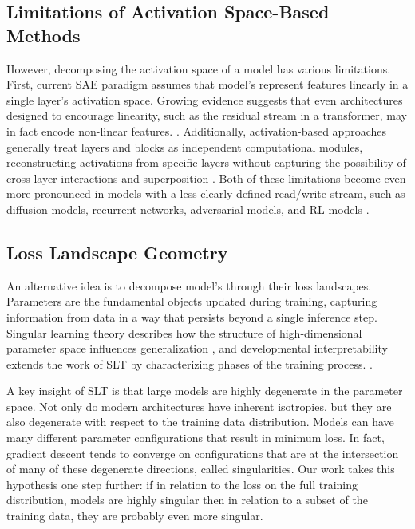 \documentclass{article}
\theoremstyle{plain}
\theoremstyle{definition}
\theoremstyle{remark}
\begin{document}
\subsection{Limitations of Activation Space-Based Methods}

However, decomposing the activation space of a model has various limitations.  First, current SAE paradigm assumes that model's represent features linearly in a single layer's activation space. Growing evidence suggests that even architectures designed to encourage linearity, such as the residual stream in a transformer, may in fact encode non-linear features. \cite{engels2024not,engels2024decomposing}. Additionally, activation-based approaches generally treat layers and blocks as independent computational modules, reconstructing activations from specific layers without capturing the possibility of cross-layer interactions and superposition \cite{merullo2024talking,lindsey2024sparse}. Both of these limitations become even more pronounced in models with a less clearly defined read/write stream, such as diffusion models, recurrent networks, adversarial models, and RL models \cite{pascanu2013difficulty,goodfellow2014generative,ho2020denoising,mnih2015human}. 

\subsection{Loss Landscape Geometry}

An alternative idea is to decompose model's through their loss landscapes. Parameters are the fundamental objects updated during training, capturing information from data in a way that persists beyond a single inference step. Singular learning theory describes how the structure of high-dimensional parameter space influences generalization \cite{watanabe2007almost,watanabe2000algebraic,watanabe2005algebraic, bushnaq2024using, davies2023unifying}, and developmental interpretability extends the work of SLT by characterizing phases of the training process. \cite{wang2024loss,hoogland2024developmental}. 

A key insight of SLT is that large models are highly degenerate \cite{wei2022deep} in the parameter space. Not only do modern architectures have inherent isotropies, but they are also degenerate with respect to the training data distribution. Models can have many different parameter configurations that result in minimum loss. In fact, gradient descent tends to converge on configurations that are at the intersection of many of these degenerate directions, called singularities.  Our work takes this hypothesis one step further: if in relation to the loss on the full training distribution, models are highly singular then in relation to a subset of the training data, they are probably even more singular. 
\end{document}
